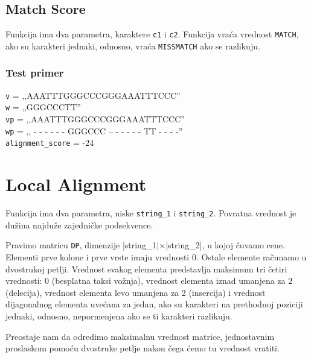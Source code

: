 \subsection{Match Score}
\label{matchScore}

Funkcija ima dva parametra, karaktere \texttt{c1} i \texttt{c2}. Funkcija vraća vrednost \texttt{MATCH}, ako su karakteri jednaki, odnosno, vraća \texttt{MISSMATCH} ako se razlikuju.







\subsubsection{Test primer}

\noindent\texttt{v} = ‚‚AAATTTGGGCCCGGGAAATTTCCC''
\\\texttt{w} = ‚‚GGGCCCTT''
\\\texttt{vp} = ‚‚AAATTTGGGCCCGGGAAATTTCCC''
\\\texttt{wp} = ‚‚ - - - - - - GGGCCC -- - -  - - - TT - - - -''
\\\texttt{alignment\_score} = -24


\section{Local Alignment}

Funkcija ima dva parametra, niske \texttt{string\_1} i \texttt{string\_2}. Povratna vrednost je dužina najduže zajedničke podsekvence.

Pravimo matricu \texttt{DP}, dimenzije |string\_1|$\times$|string\_2|, u kojoj čuvamo cene. Elementi prve kolone i prve vrste imaju vrednosti 0. Ostale elemente računamo u dvostrukoj petlji. Vrednost svakog elementa predstavlja maksimum tri četiri vrednosti: 0 (besplatna taksi vožnja), vrednost elementa iznad umanjena za 2 (delecija), vrednost elementa levo umanjena za 2 (insercija) i vrednost dijagonalnog elementa uvećana za jedan, ako su karakteri na prethodnoj poziciji jednaki, odnosno, nepormenjena ako se ti karakteri razlikuju.

Preostaje nam da odredimo maksimalnu vrednost matrice, jednostavnim proslaskom pomoću dvostruke petlje nakon čega ćemo tu vrednost vratiti.



